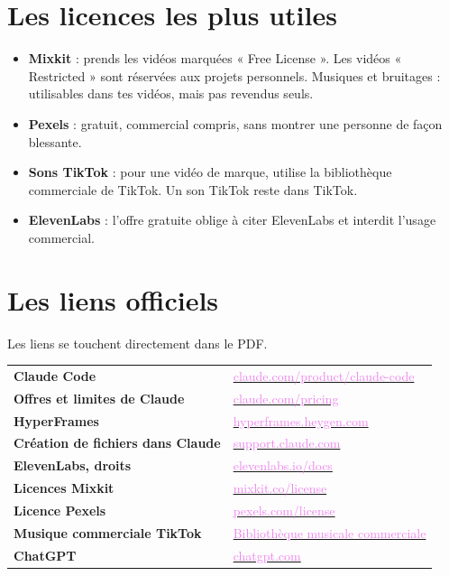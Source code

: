 \documentclass[11pt,oneside,openany]{book}
\newcommand{\lien}[2]{\href{#1}{\textcolor{violet}{#2}}}
\begin{document}
\section*{Les licences les plus utiles}
\begin{itemize}
  \item \textbf{Mixkit} : prends les vidéos marquées « Free License ». Les vidéos « Restricted » sont réservées aux projets personnels. Musiques et bruitages : utilisables dans tes vidéos, mais pas revendus seuls.
  \item \textbf{Pexels} : gratuit, commercial compris, sans montrer une personne de façon blessante.
  \item \textbf{Sons TikTok} : pour une vidéo de marque, utilise la bibliothèque commerciale de TikTok. Un son TikTok reste dans TikTok.
  \item \textbf{ElevenLabs} : l'offre gratuite oblige à citer ElevenLabs et interdit l'usage commercial.
\end{itemize}

\section*{Les liens officiels}
Les liens se touchent directement dans le PDF.
\renewcommand{\arraystretch}{1.12}
{\small
\begin{xltabular}{\linewidth}{>{\raggedright\arraybackslash\bfseries}p{3.1cm}>{\raggedright\arraybackslash}X}
\toprule
Claude Code & \lien{https://claude.com/product/claude-code}{claude.com/product/claude-code} \\
Offres et limites de Claude & \lien{https://claude.com/pricing}{claude.com/pricing} \\
HyperFrames & \lien{https://hyperframes.heygen.com}{hyperframes.heygen.com} \\
Création de fichiers dans Claude & \lien{https://support.claude.com/en/articles/12111783}{support.claude.com} \\
ElevenLabs, droits & \lien{https://elevenlabs.io/docs/help-center/legal/can-i-publish-the-content-i-generate-on-the-platform}{elevenlabs.io/docs} \\
Licences Mixkit & \lien{https://mixkit.co/license/}{mixkit.co/license} \\
Licence Pexels & \lien{https://www.pexels.com/fr-fr/license/}{pexels.com/license} \\
Musique commerciale TikTok & \lien{https://ads.tiktok.com/business/creativecenter/music/pc/en}{Bibliothèque musicale commerciale} \\
ChatGPT & \lien{https://chatgpt.com}{chatgpt.com} \\ \bottomrule
\end{xltabular}}
\end{document}
